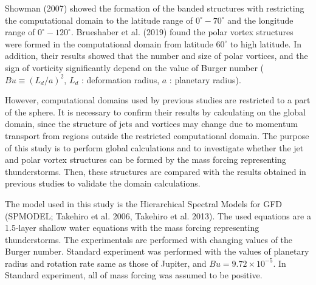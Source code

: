 \documentclass[a4j,8pt]{jarticle}
\begin{document}
%
%
Showman (2007) showed the formation of the banded structures 
with restricting the computational domain to the latitude range of
$0^\circ - 70^\circ$ and the longitude range of $0^\circ - 120^\circ$.
%
Brueshaber et al. (2019) found the polar vortex structures were formed
in the computational domain from latitude $60^\circ$ to high latitude.
%
In addition, their results showed
that the number and size of polar vortices,
and the sign of vorticity significantly depend on
the value of Burger number ($Bu \equiv (L_d/a)^2$, $L_d$ : deformation radius, $a$ : planetary radius).

However, computational domains used by previous studies are restricted to a part of the sphere.
It is necessary to confirm their results by calculating on the global domain, 
since the structure of jets and vortices may change due to momentum transport from
regions outside the restricted computational domain.
%
The purpose of this study is to perform global calculations and to investigate
whether the jet and polar vortex structures 
can be formed by the mass forcing representing thunderstorms.
%
Then, these structures are compared with the results obtained in previous studies
to validate the domain calculations.

The model used in this study is the Hierarchical Spectral Models for GFD (SPMODEL; Takehiro et al. 2006, Takehiro et al. 2013).
%
The used equations are a 1.5-layer shallow water equations
with the mass forcing representing thunderstorms.
The experimentals are performed with changing values of 
the Burger number.
Standard experiment was performed with the values of 
planetary radius and rotation rate same as those of Jupiter,
and $Bu = 9.72 \times 10^{-5}$.
In Standard experiment, all of mass forcing was assumed to be positive.
\end{document}

